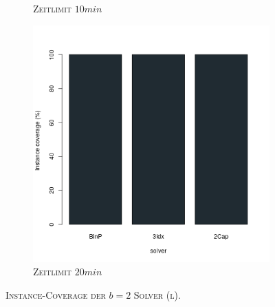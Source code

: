 \begin{figure}[H]
\begin{subfigure}[b]{0.3\textwidth}
\caption{\textsc{Zeitlimit} $10min$}
\label{fig:instance_cov_b=2_l_b}
\end{subfigure}
\hfill
\begin{subfigure}[b]{0.3\textwidth}
\centering
\includegraphics[width=1.1\textwidth]{img/solver_instance_coverage_b=2_l_1200s.png}
\caption{\textsc{Zeitlimit} $20min$}
\label{fig:instance_cov_b=2_l_c}
\end{subfigure}

\caption{\textsc{Instance-Coverage der $b=2$ Solver (l)}.}
\label{fig:instance_cov_b=2_l}
\end{figure}

\vfill
\pagebreak

